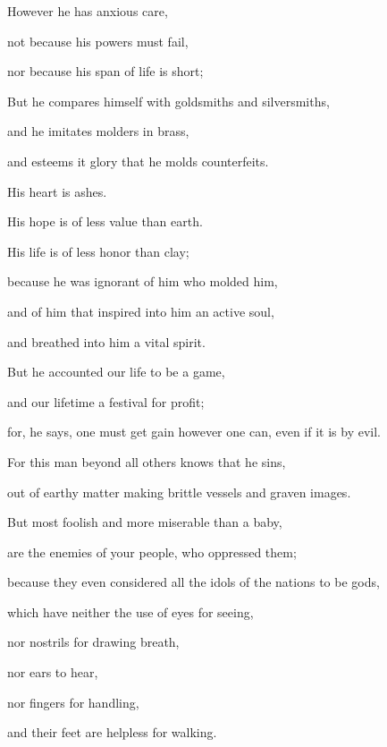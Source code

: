 {\par }{\Q {}However he has anxious care,
\par }{\QB not because his powers must fail,
\par }{\QB nor because his span of life is short;
\par }{\Q But he compares himself with goldsmiths and silversmiths,
\par }{\QB and he imitates molders in
 brass,
\par }{\QB and esteems it glory that he molds counterfeits.
\par }{\Q {}His heart is ashes.
\par }{\QB His hope is of less value than earth.
\par }{\QB His life is of less honor than clay;
\par }{\Q {}because he was ignorant of him who molded him,
\par }{\QB and of him that inspired into him
 an active
 soul,
\par }{\QB and breathed into him a vital spirit.
\par }{\Q {}But
 he accounted our life to be a game,
\par }{\QB and our
 lifetime a festival for profit;
\par }{\Q for, he says, one must get gain however one can, even if it is by evil.
\par }{\Q {}For this man beyond all others knows that he sins,
\par }{\QB out of earthy matter making brittle vessels and graven images.
\par }{\Q {}But most foolish and more miserable than a baby,
\par }{\QB are the enemies of your people, who oppressed them;
\par }{\Q {}because they even considered all the idols of the nations to be gods,
\par }{\QB which have neither the use of eyes for seeing,
\par }{\QB nor nostrils for drawing breath,
\par }{\QB nor ears to hear,
\par }{\QB nor fingers for handling,
\par }{\QB and their feet are helpless for walking.
}
